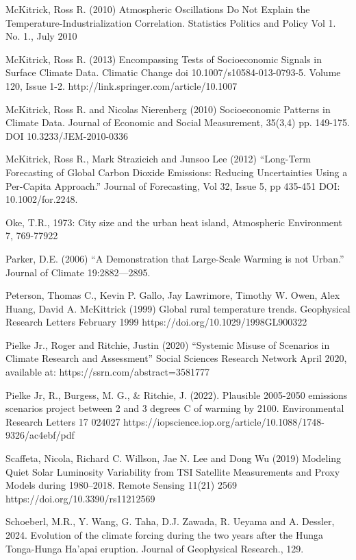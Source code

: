 \documentclass[12pt,paper=a4,DIV=12,parskip=never,chapterprefix=false,headings=standardclasses]{scrreprt}
\numberwithin{figure}{chapter}
\begin{document}
McKitrick, Ross R. (2010) Atmospheric Oscillations Do Not Explain the Temperature-Industrialization
Correlation. Statistics Politics and Policy Vol 1. No. 1., July 2010

McKitrick, Ross R. (2013) Encompassing Tests of Socioeconomic Signals in Surface Climate
Data. Climatic Change doi 10.1007/s10584-013-0793-5. Volume 120, Issue 1-2.
http://link.springer.com/article/10.1007%

McKitrick, Ross R. and Nicolas Nierenberg (2010) Socioeconomic Patterns in Climate Data. Journal of
Economic and Social Measurement, 35(3,4) pp. 149-175. DOI 10.3233/JEM-2010-0336

McKitrick, Ross R., Mark Strazicich and Junsoo Lee (2012) “Long-Term Forecasting of Global Carbon
Dioxide Emissions: Reducing Uncertainties Using a Per-Capita Approach.” Journal of
Forecasting, Vol 32, Issue 5, pp 435-451 DOI: 10.1002/for.2248.

Oke, T.R., 1973: City size and the urban heat island, Atmospheric Environment 7, 769-77922

Parker, D.E. (2006) “A Demonstration that Large-Scale Warming is not Urban.” Journal of Climate
19:2882—2895.

Peterson, Thomas C., Kevin P. Gallo, Jay Lawrimore, Timothy W. Owen, Alex Huang, David A.
McKittrick (1999) Global rural temperature trends. Geophysical Research Letters February 1999
https://doi.org/10.1029/1998GL900322

Pielke Jr., Roger and Ritchie, Justin (2020) “Systemic Misuse of Scenarios in Climate Research and
Assessment” Social Sciences Research Network April 2020, available at:
https://ssrn.com/abstract=3581777

Pielke Jr, R., Burgess, M. G., \& Ritchie, J. (2022). Plausible 2005-2050 emissions scenarios project
between 2 and 3 degrees C of warming by 2100. Environmental Research Letters 17 024027
https://iopscience.iop.org/article/10.1088/1748-9326/ac4ebf/pdf

Scaffeta, Nicola, Richard C. Willson, Jae N. Lee and Dong Wu (2019) Modeling Quiet Solar Luminosity
Variability from TSI Satellite Measurements and Proxy Models during 1980–2018. Remote Sensing
11(21) 2569 https://doi.org/10.3390/rs11212569

Schoeberl, M.R., Y. Wang, G. Taha, D.J. Zawada, R. Ueyama and A. Dessler, 2024. Evolution of the
climate forcing during the two years after the Hunga Tonga-Hunga Ha’apai eruption. Journal of
Geophysical Research., 129.
\end{document}
